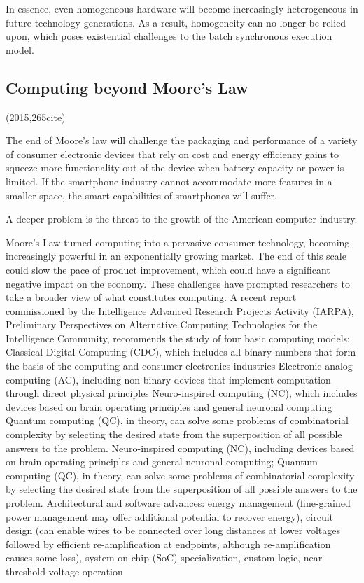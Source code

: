 \documentclass[a4paper,twoside]{scrbook}
\begin{document}
In essence, even homogeneous hardware will become increasingly heterogeneous in future technology generations. As a result, homogeneity can no longer be relied upon, which poses existential challenges to the batch synchronous execution model.

\subsection{Computing beyond Moore’s Law
\cite{shalf2015computing}}
(2015,265cite)\par
The end of Moore's law will challenge the packaging and performance of a variety of consumer electronic devices that rely on cost and energy efficiency gains to squeeze more functionality out of the device when battery capacity or power is limited. If the smartphone industry cannot accommodate more features in a smaller space, the smart capabilities of smartphones will suffer.
\par
A deeper problem is the threat to the growth of the American computer industry.
\par
Moore's Law turned computing into a pervasive consumer technology, becoming increasingly powerful in an exponentially growing market. The end of this scale could slow the pace of product improvement, which could have a significant negative impact on the economy.
These challenges have prompted researchers to take a broader view of what constitutes computing. A recent report commissioned by the Intelligence Advanced Research Projects Activity (IARPA), Preliminary Perspectives on Alternative Computing Technologies for the Intelligence Community, recommends the study of four basic computing models:
Classical Digital Computing (CDC), which includes all binary numbers that form the basis of the computing and consumer electronics industries
Electronic analog computing (AC), including non-binary devices that implement computation through direct physical principles
Neuro-inspired computing (NC), which includes devices based on brain operating principles and general neuronal computing
Quantum computing (QC), in theory, can solve some problems of combinatorial complexity by selecting the desired state from the superposition of all possible answers to the problem.
Neuro-inspired computing (NC), including devices based on brain operating principles and general neuronal computing; Quantum computing (QC), in theory, can solve some problems of combinatorial complexity by selecting the desired state from the superposition of all possible answers to the problem.
Architectural and software advances: energy management (fine-grained power management may offer additional potential to recover energy), circuit design (can enable wires to be connected over long distances at lower voltages followed by efficient re-amplification at endpoints, although re-amplification causes some loss), system-on-chip (SoC) specialization, custom logic, near-threshold voltage operation
\end{document}
